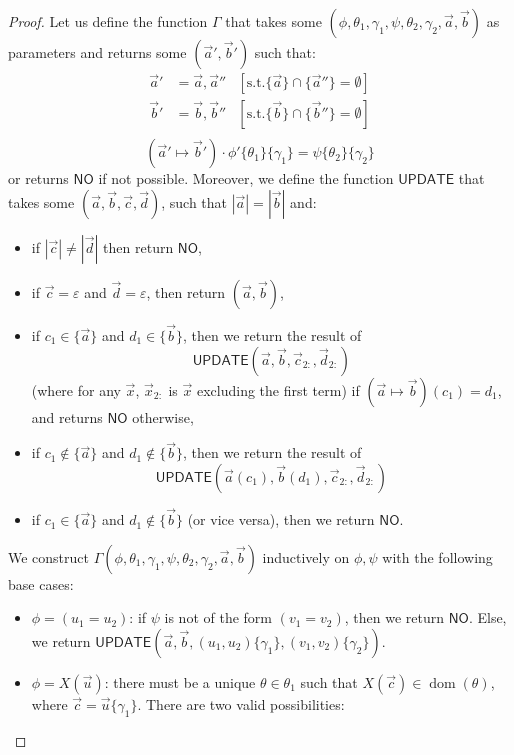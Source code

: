 \documentclass[10pt,a4paper]{article}
\theoremstyle{definition}
\theoremstyle{remark}
\DeclareMathOperator{\dom}{dom}
\newcommand{\move}[2]{(#1\mapsto#2)}
\newcommand\NO[0]{\mathsf{NO}}
\newcommand\update[0]{\mathsf{UPDATE}}
\begin{document}
\begin{proof}
	Let us define the function $\Gamma$ that takes some $(\phi, \theta_1, \gamma_1, \psi, \theta_2, \gamma_2, \vec a, \vec b)$ as parameters and returns some $(\vec a', \vec b')$ such that:
	\[
	\begin{aligned}
		\vec a' &= \vec a, \vec a'' &[\text{s.t.} \{\vec a\} \cap \{\vec a''\} = \emptyset]\\
		\vec b' &= \vec b, \vec b'' &[\text{s.t.} \{\vec b\} \cap \{\vec b''\} = \emptyset]\\
	\end{aligned}
	\]
	\vspace{-1.5ex}
	\[
	\move{\vec a'}{\vec b'} \cdot \phi'\{\theta_1\}\{\gamma_1\} = \psi\{\theta_2\}\{\gamma_2\}
	\]
	or returns $\NO$ if not possible. 
	Moreover, we define the function $\update$ that takes some $(\vec a, \vec b, \vec c, \vec d)$, such that $|\vec a| = |\vec b|$ and:
	\begin{itemize}
		\item if $|\vec c| \neq |\vec d|$ then return $\NO$,
				\item if $\vec c = \varepsilon$ and $\vec d = \varepsilon$, then return $(\vec a, \vec b)$,
				\item if $c_1 \in \{\vec a\}$ and $d_1 \in \{\vec b\}$, then 
		we
		return the result of $$\update(\vec a, \vec b, \vec{c}_{2:}, \vec{d}_{2:})$$ (where for any $\vec x$, $\vec{x}_{2:}$ is $\vec{x}$ excluding the first term) if $\move{\vec a}{\vec b}(c_1) = d_1$, and returns $\NO$ otherwise,
				\item if $c_1 \notin \{\vec a\}$ and $d_1 \notin \{\vec b\}$, then we 
		return the result of $$\update(\vec a(c_1), \vec b(d_1), \vec{c}_{2:}, \vec{d}_{2:})$$
				\item if $c_1 \in \{\vec a\}$ and $d_1 \notin \{\vec b\}$ (or vice versa), then we return $\NO$.
	\end{itemize}
	We construct $\Gamma(\phi, \theta_1, \gamma_1, \psi, \theta_2, \gamma_2, \vec a, \vec b)$ inductively on $\phi, \psi$ with the following base cases:
	\begin{itemize}
		\item $\phi = (u_1=u_2)$: 
		if $\psi$ is not of the form $(v_1 = v_2)$, then we return $\NO$. 
		Else, we return $\update(\vec a, \vec b, (u_1,u_2)\{\gamma_1\}, (v_1,v_2)\{\gamma_2\})$.
				\item $\phi = X(\vec u)$: there must be a unique $\theta \in \theta_1$  such that $X(\vec c)\in\dom(\theta)$, where $\vec c=\vec u\{\gamma_1\}$.
		There are two valid possibilities:

\end{itemize}
\end{proof}
\end{document}
